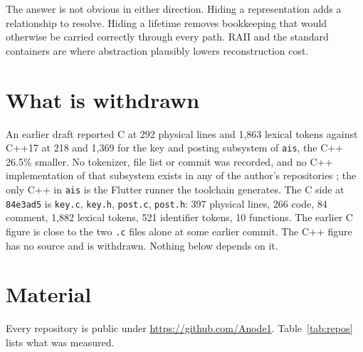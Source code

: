 \documentclass[11pt,a4paper]{article}
\begin{document}
The answer is not obvious in either direction. Hiding a representation adds a relationship to resolve. Hiding a lifetime removes bookkeeping that would otherwise be carried correctly through every path. RAII and the standard containers are where abstraction plausibly lowers reconstruction cost.

\section{What is withdrawn}

An earlier draft reported C at 292 physical lines and 1,863 lexical tokens against C++17 at 218 and 1,369 for the key and posting subsystem of \texttt{ais}, the C++ 26.5\% smaller. No tokenizer, file list or commit was recorded, and no C++ implementation of that subsystem exists in any of the author's repositories \cite{anode1}; the only C++ in \texttt{ais} is the Flutter runner the toolchain generates. The C side at \texttt{84e3ad5} is \texttt{key.c}, \texttt{key.h}, \texttt{post.c}, \texttt{post.h}: 397 physical lines, 266 code, 84 comment, 1,882 lexical tokens, 521 identifier tokens, 10 functions. The earlier C figure is close to the two \texttt{.c} files alone at some earlier commit. The C++ figure has no source and is withdrawn. Nothing below depends on it.

\section{Material}

Every repository is public under \url{https://github.com/Anode1}. Table~\ref{tab:repos} lists what was measured.
\end{document}
